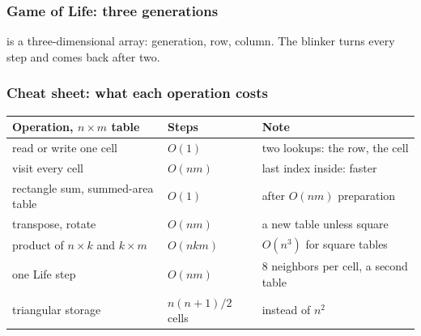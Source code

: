 \documentclass[aspectratio=169,10pt,compress]{beamer}
\begin{document}
\begin{frame}[t,fragile] \frametitle{Game of Life: three generations}

	\footnotesize {} is a three-dimensional array: generation, row, column. The blinker turns
	every step and comes back after two.
\end{frame}








\begin{frame}[t,fragile] \frametitle{Cheat sheet: what each operation costs}


\begin{table}
		\small
		\begin{tabular}{@{}L{0.40\textwidth}L{0.16\textwidth}L{0.36\textwidth}@{}}
			\toprule
			\textbf{Operation, $n \times m$ table} & \textbf{Steps} & \textbf{Note} \\
			\midrule
			read or write one cell                  & $O(1)$          & two lookups: the row, the cell \\
			visit every cell                        & $O(n m)$        & last index inside: faster \\
			rectangle sum, summed-area table        & $O(1)$          & after $O(n m)$ preparation \\
			transpose, rotate                       & $O(n m)$        & a new table unless square \\
			product of $n \times k$ and $k \times m$ & $O(n k m)$      & $O(n^{3})$ for square tables \\
			one Life step                           & $O(n m)$        & 8 neighbors per cell, a second table \\
			triangular storage                      & $n(n+1)/2$ cells & instead of $n^{2}$ \\
			\bottomrule
		\end{tabular}
\end{table}%
\end{frame}
\end{document}
